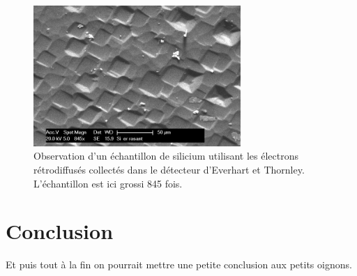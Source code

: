 \documentclass[a4paper,12pt]{article}
\newcommand\ett{Everhart et Thornley\xspace}
\begin{document}
\begin{figure}
\centering
\includegraphics[width=0.7\textwidth]{images/si_er_rasant.png}
\caption{Observation d'un échantillon de silicium utilisant les électrons rétrodiffusés collectés dans le détecteur d'\ett. L'échantillon est ici grossi 845 fois.}
\label{fig:si_er_rasant}
\end{figure}


\section*{Conclusion}

Et puis tout à la fin on pourrait mettre une petite conclusion aux petits oignons.
\end{document}

